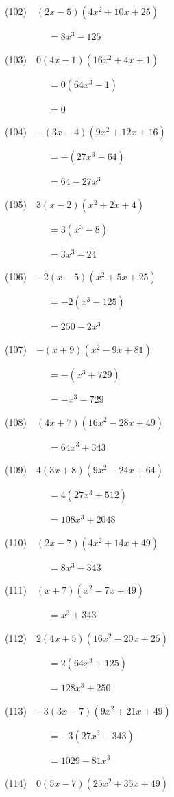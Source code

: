 \documentclass[a4j,twocolumn,10pt,fleqn]{jarticle}
\begin{document}
(102)~~$\left(2 x - 5\right) \left(4 x^{2} + 10 x + 25\right)$

~~~~~~~~~$=8 x^{3} - 125$

(103)~~$0\left(4 x - 1\right) \left(16 x^{2} + 4 x + 1\right)$

~~~~~~~~~$=0(64 x^{3} - 1)$

~~~~~~~~~$=0$

(104)~~$-\left(3 x - 4\right) \left(9 x^{2} + 12 x + 16\right)$

~~~~~~~~~$=-(27 x^{3} - 64)$

~~~~~~~~~$=64 - 27 x^{3}$

(105)~~$3\left(x - 2\right) \left(x^{2} + 2 x + 4\right)$

~~~~~~~~~$=3(x^{3} - 8)$

~~~~~~~~~$=3 x^{3} - 24$

(106)~~$-2\left(x - 5\right) \left(x^{2} + 5 x + 25\right)$

~~~~~~~~~$=-2(x^{3} - 125)$

~~~~~~~~~$=250 - 2 x^{3}$

(107)~~$-\left(x + 9\right) \left(x^{2} - 9 x + 81\right)$

~~~~~~~~~$=-(x^{3} + 729)$

~~~~~~~~~$=- x^{3} - 729$

(108)~~$\left(4 x + 7\right) \left(16 x^{2} - 28 x + 49\right)$

~~~~~~~~~$=64 x^{3} + 343$

(109)~~$4\left(3 x + 8\right) \left(9 x^{2} - 24 x + 64\right)$

~~~~~~~~~$=4(27 x^{3} + 512)$

~~~~~~~~~$=108 x^{3} + 2048$

(110)~~$\left(2 x - 7\right) \left(4 x^{2} + 14 x + 49\right)$

~~~~~~~~~$=8 x^{3} - 343$

(111)~~$\left(x + 7\right) \left(x^{2} - 7 x + 49\right)$

~~~~~~~~~$=x^{3} + 343$

(112)~~$2\left(4 x + 5\right) \left(16 x^{2} - 20 x + 25\right)$

~~~~~~~~~$=2(64 x^{3} + 125)$

~~~~~~~~~$=128 x^{3} + 250$

(113)~~$-3\left(3 x - 7\right) \left(9 x^{2} + 21 x + 49\right)$

~~~~~~~~~$=-3(27 x^{3} - 343)$

~~~~~~~~~$=1029 - 81 x^{3}$

(114)~~$0\left(5 x - 7\right) \left(25 x^{2} + 35 x + 49\right)$
\end{document}
